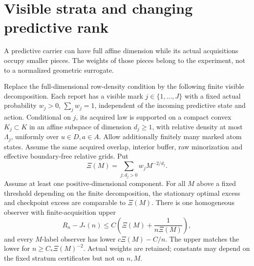 \section{Visible strata and changing predictive rank}\label{sec:strata}
A predictive carrier can have full affine dimension while its actual acquisitions occupy smaller pieces. The weights of those pieces belong to the experiment, not to a normalized geometric surrogate.

\begin{theorem}\label{thm:strata}
Replace the full-dimensional row-density condition by the following finite visible decomposition. Each report has a visible mark $j\in\{1,\ldots,J\}$ with a fixed actual probability $w_j>0$, $\sum_jw_j=1$, independent of the incoming predictive state and action. Conditional on $j$, its acquired law is supported on a compact convex $K_j\subset K$ in an affine subspace of dimension $d_j\ge1$, with relative density at most $\Lambda_j$, uniformly over $u\in D,a\in A$. Allow additionally finitely many marked atom states. Assume the same acquired overlap, interior buffer, raw minorization and effective boundary-free relative grids. Put
\begin{equation}\label{eq:xi}
 \Xi(M)=\sum_{j:d_j>0}w_j M^{-2/d_j}.
\end{equation}
Assume at least one positive-dimensional component. For all $M$ above a fixed threshold depending on the finite decomposition, the stationary optimal excess and checkpoint excess are comparable to $\Xi(M)$. There is one homogeneous observer with finite-acquisition upper
\[
 R_n-J_*(n)\le C\left(\Xi(M)+\frac1{n\Xi(M)}\right),
\]
and every $M$-label observer has lower $c\Xi(M)-C/n$. The upper matches the lower for $n\ge C_*\Xi(M)^{-2}$. Actual weights are retained; constants may depend on the fixed stratum certificates but not on $n,M$.
\end{theorem}
